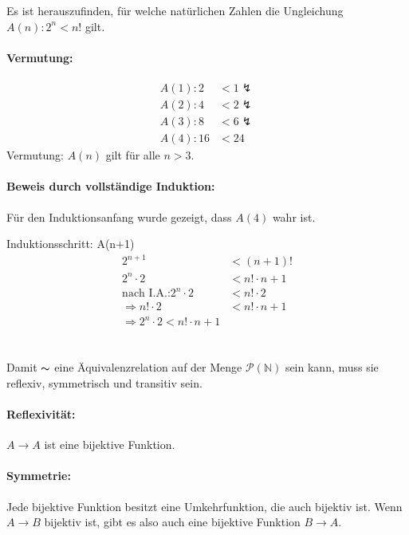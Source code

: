 \documentclass[11pt,a4paper]{article}
\begin{document}
\section{}
Es ist herauszufinden, für welche natürlichen Zahlen die Ungleichung $A(n): 2^n < n!$ gilt.

\paragraph{Vermutung:}

\begin{align*}
A(1): 2 &< 1 \lightning\\
A(2): 4 &< 2 \lightning\\
A(3): 8 &< 6 \lightning\\
A(4): 16 &< 24 \tag*{\checkmark}
\end{align*}
Vermutung: $A(n)$ gilt für alle $n > 3$.

\paragraph{Beweis durch vollständige Induktion:}

Für den Induktionsanfang wurde gezeigt, dass $A(4)$ wahr ist.

Induktionsschritt: A(n+1)
\begin{align*}
2^{n+1} &< (n+1)!\\
2^n \cdot 2 &< n! \cdot n+1\\
\mbox{nach I.A.:} 2^n \cdot 2 &< n! \cdot 2\\
\Rightarrow n! \cdot 2 &< n! \cdot n+1\\
\Rightarrow 2^n \cdot 2 < n! \cdot n+1 \tag*{\checkmark}
\end{align*}

\section{}
Damit $\thicksim$ eine Äquivalenzrelation auf der Menge $\mathcal{P}(\mathbb{N})$ sein kann, muss sie reflexiv, symmetrisch und transitiv sein.

\paragraph{Reflexivität:}
$A \rightarrow A$ ist eine bijektive Funktion. \checkmark

\paragraph{Symmetrie:}
Jede bijektive Funktion besitzt eine Umkehrfunktion, die auch bijektiv ist. Wenn $A \rightarrow B$ bijektiv ist, gibt es also auch eine bijektive Funktion $B \rightarrow A$.
\end{document}
